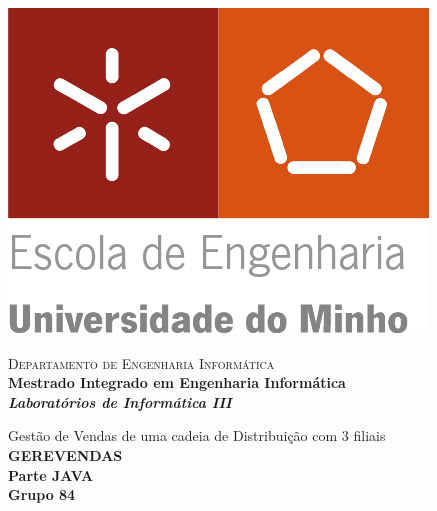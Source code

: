 \begin{titlepage}


\begin{minipage}{0.3\textwidth}
\begin{flushleft} 
\includegraphics[width=\textwidth]{logo.png}
\end{flushleft}
\end{minipage}
\begin{minipage}{0.6\textwidth}
\begin{flushright} 

\textsc{Departamento de Engenharia Informática}\\[0.1cm]
\bfseries Mestrado Integrado em Engenharia Informática \\ [0.1cm]
\bfseries \textit{Laboratórios de Informática III}\\[8mm]

\end{flushright}
\end{minipage}


\vspace{3cm}


\begin{center}


\LARGE Gestão de Vendas de uma cadeia de Distribuição com 3 filiais\\[1cm]

\Large \textbf{GEREVENDAS}\\[1cm] 

\Large \textbf{Parte JAVA}\\[1cm]
{\Large \bfseries Grupo 84\\[1.5cm]}



\end{center}
\end{titlepage}
